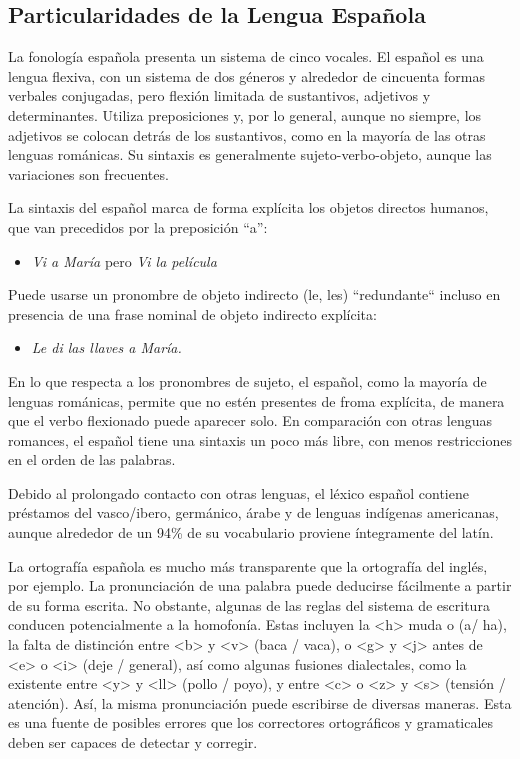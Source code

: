 \begin{multicols}{2}
\subsection{Particularidades de la Lengua Española}

La fonología española presenta un sistema de cinco vocales. El español es una lengua flexiva, con un sistema de dos géneros y alrededor de cincuenta formas verbales conjugadas, pero flexión limitada de sustantivos, adjetivos y determinantes. Utiliza preposiciones y, por lo general, aunque no siempre, los adjetivos se colocan detrás de los sustantivos, como en la mayoría de las otras lenguas románicas. Su sintaxis es generalmente sujeto-verbo-objeto, aunque las variaciones son frecuentes. \cite{spanishgram}


La sintaxis del español marca de forma explícita los objetos directos humanos, que van precedidos por la preposición "`a"':
\begin{itemize}
  \item[] \textit{Vi a María} pero \textit{Vi la película}
\end{itemize}
  
Puede usarse un pronombre de objeto indirecto (le, les) “redundante“  incluso en presencia de una frase nominal de objeto indirecto explícita:

\begin{itemize}
  \item[] \textit{Le di las llaves a María.}
\end{itemize}

En lo que respecta a los pronombres de sujeto, el español, como la mayoría de lenguas románicas, permite que no estén presentes de froma explícita, de manera que el verbo flexionado puede aparecer solo. En comparación con otras lenguas romances, el español tiene una sintaxis un poco más libre, con menos restricciones en el orden de las palabras.

Debido al prolongado contacto con otras lenguas, el léxico español contiene préstamos del vasco/ibero, germánico, árabe y de lenguas indígenas americanas, aunque alrededor de un 94\% de su vocabulario proviene íntegramente del latín.

La ortografía española es mucho más transparente que la ortografía del inglés, por ejemplo. La pronunciación de una palabra puede deducirse fácilmente a partir de su forma escrita. No obstante, algunas de las reglas del sistema de escritura conducen potencialmente a la homofonía. Estas incluyen la <h> muda o (a/ ha), la falta de distinción entre <b> y <v> (baca / vaca), o <g> y <j> antes de <e> o <i> (deje / general), así como algunas fusiones dialectales, como la existente entre <y> y <ll> (pollo / poyo), y entre <c> o <z> y <s> (tensión / atención). Así, la misma pronunciación puede escribirse de diversas maneras. Esta es una fuente de posibles errores que los correctores ortográficos y gramaticales deben ser capaces de detectar y corregir.


\end{multicols}
